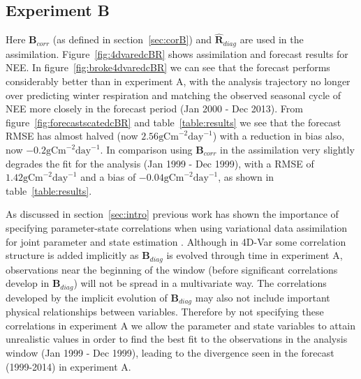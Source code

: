 \documentclass[review]{elsarticle}
\begin{document}
\subsection{Experiment B} \label{sec:expb}

Here $\textbf{B}_{corr}$ (as defined in section~\ref{sec:corB}) and $\hat{\textbf{R}}_{diag}$ are used in the assimilation. Figure~\ref{fig:4dvaredcBR} shows assimilation and forecast results for NEE. In figure~\ref{fig:broke4dvaredcBR} we can see that the forecast performs considerably better than in experiment A, with the analysis trajectory no longer over predicting winter respiration and matching the observed seasonal cycle of NEE more closely in the forecast period (Jan 2000 - Dec 2013). From figure~\ref{fig:forecastscatedcBR} and table~\ref{table:results} we see that the forecast RMSE has almost halved (now $2.56 \text{gCm}^{-2}\text{day}^{-1}$) with a reduction in bias also, now $-0.2 \text{gCm}^{-2}\text{day}^{-1}$. In comparison using $\textbf{B}_{corr}$ in the assimilation very slightly degrades the fit for the analysis (Jan 1999 - Dec 1999), with a RMSE of $1.42 \text{gCm}^{-2}\text{day}^{-1}$ and a bias of $-0.04 \text{gCm}^{-2}\text{day}^{-1}$, as shown in table~\ref{table:results}. 

As discussed in section~\ref{sec:intro} previous work has shown the importance of specifying parameter-state correlations when using variational data assimilation for joint parameter and state estimation \citep{smith2009variational}. Although in 4D-Var some correlation structure is added implicitly as $\textbf{B}_{diag}$ is evolved through time in experiment A, observations near the beginning of the window (before significant correlations develop in $\textbf{B}_{diag}$) will not be spread in a multivariate way. The correlations developed by the implicit evolution of $\textbf{B}_{diag}$ may also not include important physical relationships between variables. Therefore by not specifying these correlations in experiment A we allow the parameter and state variables to attain unrealistic values in order to find the best fit to the observations in the analysis window (Jan 1999 - Dec 1999), leading to the divergence seen in the forecast (1999-2014) in experiment A.
 
\end{document}
